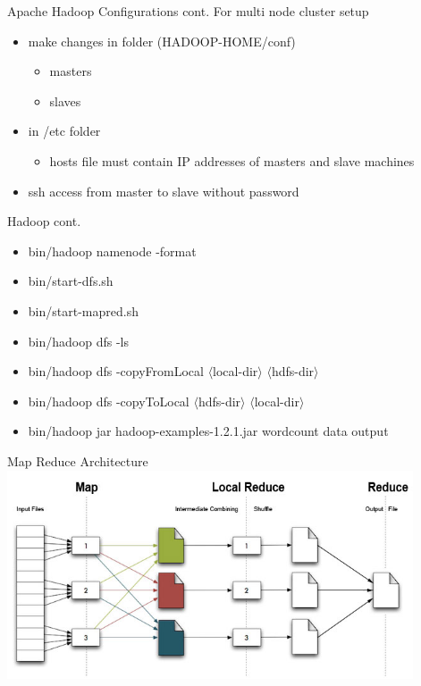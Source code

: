 \documentclass{beamer}
\begin{document}
\begin{frame}{Apache Hadoop Configurations cont.}
For multi node cluster setup 
\begin{itemize}
\item make changes in folder (HADOOP-HOME/conf)
\begin{itemize}
\item masters
\item slaves
\end{itemize}
\item in /etc folder
\begin{itemize}
\item hosts file must contain IP addresses of masters and slave machines
\end{itemize}
\item ssh access from master to slave without password
\end{itemize}
\end{frame}

\begin{frame}{Hadoop cont.}
\begin{itemize}
\item bin/hadoop namenode -format
\item bin/start-dfs.sh
\item bin/start-mapred.sh
\item bin/hadoop dfs -ls
\item bin/hadoop dfs -copyFromLocal $\langle$local-dir$\rangle$ $\langle$hdfs-dir$\rangle$
\item bin/hadoop dfs -copyToLocal $\langle$hdfs-dir$\rangle$ $\langle$local-dir$\rangle$
\item bin/hadoop jar hadoop-examples-1.2.1.jar wordcount data output
\end{itemize}
\end{frame}

\begin{frame}{Map Reduce Architecture}
\includegraphics[width=0.9\textwidth]{images/1.jpg} 
\end{frame}
\end{document}
